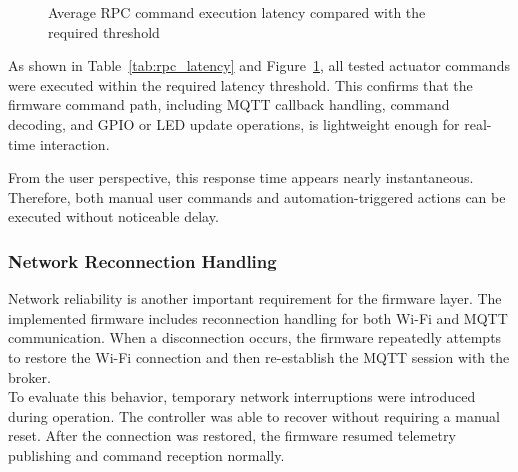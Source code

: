 \begin{figure}[H]
\centering
{}
\caption{Average RPC command execution latency compared with the required threshold}
\label{fig:rpc_latency_chart}
\end{figure}

As shown in Table~\ref{tab:rpc_latency} and Figure~\ref{fig:rpc_latency_chart}, all tested actuator commands were executed within the required latency threshold. This confirms that the firmware command path, including MQTT callback handling, command decoding, and GPIO or LED update operations, is lightweight enough for real-time interaction.

From the user perspective, this response time appears nearly instantaneous. Therefore, both manual user commands and automation-triggered actions can be executed without noticeable delay.

\subsubsection{Network Reconnection Handling}

Network reliability is another important requirement for the firmware layer. The implemented firmware includes reconnection handling for both Wi-Fi and MQTT communication. When a disconnection occurs, the firmware repeatedly attempts to restore the Wi-Fi connection and then re-establish the MQTT session with the broker. \\

To evaluate this behavior, temporary network interruptions were introduced during operation. The controller was able to recover without requiring a manual reset. After the connection was restored, the firmware resumed telemetry publishing and command reception normally.

